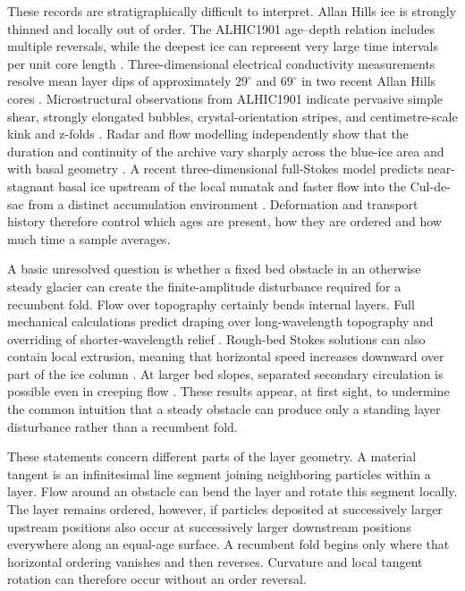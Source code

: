 \documentclass[review]{igs}
\newcommand{\parencite}{\citep}
\theoremstyle{definition}
\theoremstyle{remark}
\begin{document}
These records are stratigraphically difficult to interpret. Allan Hills ice is strongly thinned and locally out of order. The ALHIC1901 age--depth relation includes multiple reversals, while the deepest ice can represent very large time intervals per unit core length \parencite{Shackleton2025}. Three-dimensional electrical conductivity measurements resolve mean layer dips of approximately \(29^{\circ}\) and \(69^{\circ}\) in two recent Allan Hills cores \parencite{Kirkpatrick2025}. Microstructural observations from ALHIC1901 indicate pervasive simple shear, strongly elongated bubbles, crystal-orientation stripes, and centimetre-scale kink and z-folds \parencite{Stoll2026}. Radar and flow modelling independently show that the duration and continuity of the archive vary sharply across the blue-ice area and with basal geometry \parencite{Kehrl2018}. A recent three-dimensional full-Stokes model predicts near-stagnant basal ice upstream of the local nunatak and faster flow into the Cul-de-sac from a distinct accumulation environment \parencite{Manos2026}. Deformation and transport history therefore control which ages are present, how they are ordered and how much time a sample averages.

A basic unresolved question is whether a fixed bed obstacle in an otherwise steady glacier can create the finite-amplitude disturbance required for a recumbent fold. Flow over topography certainly bends internal layers. Full mechanical calculations predict draping over long-wavelength topography and overriding of shorter-wavelength relief \parencite{Hindmarsh2006}. Rough-bed Stokes solutions can also contain local extrusion, meaning that horizontal speed increases downward over part of the ice column \parencite{Gudmundsson1997linear,Waddington2010}. At larger bed slopes, separated secondary circulation is possible even in creeping flow \parencite{Gudmundsson1997nonlinear}. These results appear, at first sight, to undermine the common intuition that a steady obstacle can produce only a standing layer disturbance rather than a recumbent fold.

These statements concern different parts of the layer geometry. A material tangent is an infinitesimal line segment joining neighboring particles within a layer. Flow around an obstacle can bend the layer and rotate this segment locally. The layer remains ordered, however, if particles deposited at successively larger upstream positions also occur at successively larger downstream positions everywhere along an equal-age surface. A recumbent fold begins only where that horizontal ordering vanishes and then reverses. Curvature and local tangent rotation can therefore occur without an order reversal.
\end{document}
